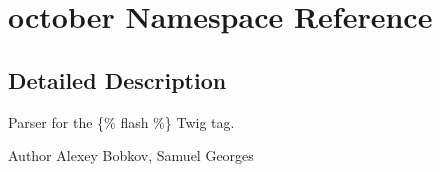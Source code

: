\hypertarget{namespaceoctober}{}\section{october Namespace Reference}
\label{namespaceoctober}


\subsection{Detailed Description}
Parser for the \{\% flash \%\} Twig tag.

\begin{DoxyAuthor}{Author}
Alexey Bobkov, Samuel Georges 
\end{DoxyAuthor}
